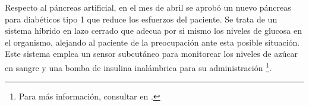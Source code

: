 \begin{enumerate}
\end{enumerate}

Respecto al páncreas artificial, en el mes de abril se aprobó un nuevo páncreas para diabéticos tipo 1 que reduce los esfuerzos del paciente. Se trata de un sistema híbrido en lazo cerrado que adecua por si mismo los niveles de glucosa en el organismo, alejando al paciente de la preocupación ante esta posible situación. Este sistema emplea un sensor subcutáneo para monitorear los niveles de azúcar en sangre y una bomba de insulina inalámbrica para su administración \footnote{Para más información, consultar en \cite{gizmodo_pancreas_artificial}.}.
